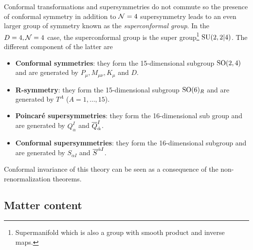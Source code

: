         Conformal transformations and supersymmetries do not commute so the presence of conformal symmetry in addition to $\mathcal{N}=4$ supersymmetry leads to an even larger group of symmetry known as the \emph{superconformal group}. In the $D=4,\mathcal{N}=4$ case, the superconformal group is the super group\footnote{Supermanifold which is also a group with smooth product and inverse maps.} $\text{SU}(2,2|4)$. The different component of the latter are
        \begin{itemize}
            \item \textbf{Conformal symmetries}: they form the 15-dimensional subgroup $\text{SO}(2,4)$ and are generated by $P_\mu,M_{\mu\nu},K_\mu$ and $D$.
            \item \textbf{R-symmetry}: they form the 15-dimensional subgroup $\text{SO}(6)_R$ and are generated by $T^A$ ($A=1,\dots,15$).
            \item \textbf{Poincaré supersymmetries}: they form the 16-dimensional sub group \marker and are generated by $Q^I_\alpha$ and $\overline{Q}^I_{\dot{\alpha}}$.
            \item \textbf{Conformal supersymmetries}: they form the 16-dimensional subgroup \marker and are generated by $S_{\alpha I}$ and $\overline{S}^{\dot{\alpha} I}$.
        \end{itemize}

        Conformal invariance of this theory can be seen as a consequence of the non-renormalization theorems.

    \subsection{Matter content}
        
